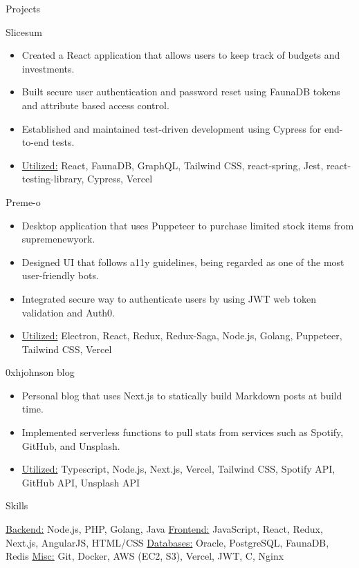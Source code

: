 \documentclass[calibri]{mcdowellcv}
\begin{document}
	\begin{cvsection}{Projects}
		\begin{cvsubsection}{Slicesum}{}{}
			\begin{itemize}
        \item Created a React application that allows users to keep track of budgets and investments.
        \item Built secure user authentication and password reset using FaunaDB tokens and attribute based access control.
        \item Established and maintained test-driven development using Cypress for end-to-end tests.
				\item \underline{Utilized:} React, FaunaDB, GraphQL, Tailwind CSS, react-spring, Jest, react-testing-library, Cypress, Vercel
    	\end{itemize}
		\end{cvsubsection}

		\begin{cvsubsection}{Preme-o}{}{}
			\begin{itemize}
        \item Desktop application that uses Puppeteer to purchase limited stock items from supremenewyork.
        \item Designed UI that follows a11y guidelines, being regarded as one of the most user-friendly bots.
        \item Integrated secure way to authenticate users by using JWT web token validation and Auth0.
				\item \underline{Utilized:} Electron, React, Redux, Redux-Saga, Node.js, Golang, Puppeteer, Tailwind CSS, Vercel
    	\end{itemize}
		\end{cvsubsection}

		\begin{cvsubsection}{0xhjohnson blog}{}{}
			\begin{itemize}
        \item Personal blog that uses Next.js to statically build Markdown posts at build time.
        \item Implemented serverless functions to pull stats from services such as Spotify, GitHub, and Unsplash.
				\item \underline{Utilized:} Typescript, Node.js, Next.js, Vercel, Tailwind CSS, Spotify API, GitHub API, Unsplash API
    	\end{itemize}
		\end{cvsubsection}
	\end{cvsection}
	
	\begin{cvsection}{Skills}
		\begin{cvsubsection}{}{}{}	
				\underline{Backend:} Node.js, PHP, Golang, Java
				\hfill
				\underline{Frontend:} JavaScript, React, Redux, Next.js, AngularJS, HTML/CSS
				\underline{Databases:} Oracle, PostgreSQL, FaunaDB, Redis
				\hfill
				\underline{Misc:} Git, Docker, AWS (EC2, S3), Vercel, JWT, C, Nginx
		\end{cvsubsection}
	\end{cvsection}
	
\end{document}
